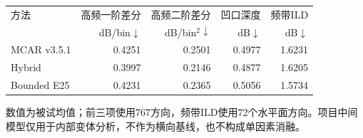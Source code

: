 \begin{table}[htbp]
\centering\small
\setlength{\tabcolsep}{4pt}
\begin{tabular}{lrrrr}
\toprule
方法 & 高频一阶差分 & 高频二阶差分 & 凹口深度 & 频带ILD\\
 & dB/bin$\downarrow$ & dB/bin$^2\downarrow$ & dB$\downarrow$ & dB$\downarrow$\\
\midrule
MCAR v3.5.1 & 0.4251 & 0.2501 & 0.4977 & 1.6231 \\
Hybrid & 0.3997 & 0.2146 & 0.4877 & 1.6205 \\
Bounded E25 & 0.4231 & 0.2365 & 0.5056 & 1.5734 \\
\bottomrule
\end{tabular}
\par\smallskip
\parbox{\linewidth}{\footnotesize 数值为被试均值；前三项使用767方向，频带ILD使用72个水平面方向。项目中间模型仅用于内部变体分析，不作为横向基线，也不构成单因素消融。}
\end{table}
